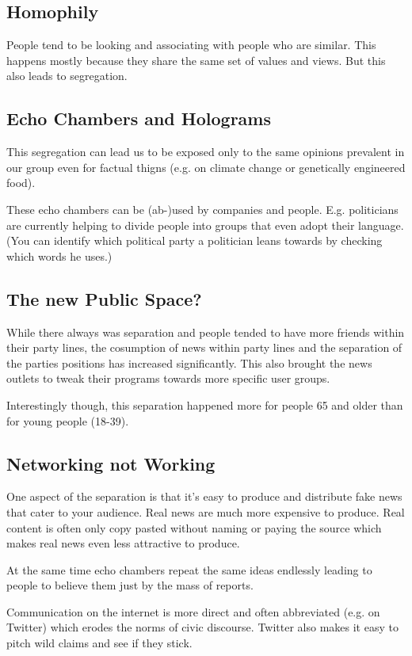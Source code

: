 \documentclass[a4paper, twocolumn]{article}
\begin{document}
\subsection{Homophily}
People tend to be looking and associating with people who are similar. This happens mostly because they share the same set of values and views. But this also leads to segregation.

\subsection{Echo Chambers and Holograms}
This segregation can lead us to be exposed only to the same opinions prevalent in our group even for factual thigns (e.g. on climate change or genetically engineered food).

These echo chambers can be (ab-)used by companies and people. E.g. politicians are currently helping to divide people into groups that even adopt their language. (You can identify which political party a politician leans towards by checking which words he uses.)

\subsection{The new Public Space?}
While there always was separation and people tended to have more friends within their party lines, the cosumption of news within party lines and the separation of the parties positions has increased significantly. This also brought the news outlets to tweak their programs towards more specific user groups.

Interestingly though, this separation happened more for people 65 and older than for young people (18-39).

\subsection{Networking not Working}
One aspect of the separation is that it's easy to produce and distribute fake news that cater to your audience. Real news are much more expensive to produce. Real content is often only copy pasted without naming or paying the source which makes real news even less attractive to produce.

At the same time echo chambers repeat the same ideas endlessly leading to people to believe them just by the mass of reports.

Communication on the internet is more direct and often abbreviated (e.g. on Twitter) which erodes the norms of civic discourse. Twitter also makes it easy to pitch wild claims and see if they stick.
\end{document}
